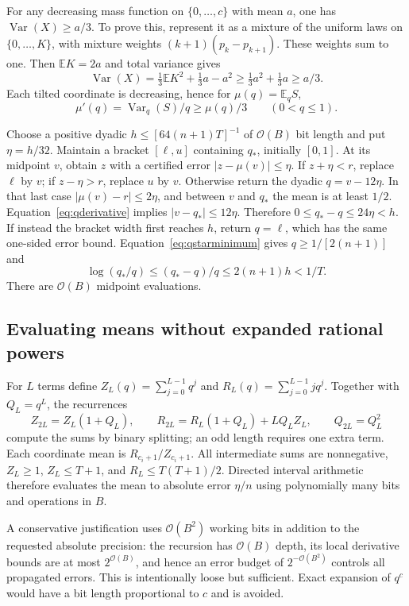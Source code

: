 \documentclass[11pt,a4paper]{article}
\theoremstyle{definition}
\newcommand{\E}{\mathbb E}
\newcommand{\Var}{\operatorname{Var}}
\newcommand{\abs}[1]{\left|#1\right|}
\newcommand{\BigO}{\mathcal O}
\begin{document}
For any decreasing mass function on $\{0,\ldots,c\}$ with mean $a$, one has $\Var(X)\ge a/3$. To prove this, represent it as a mixture of the uniform laws on $\{0,\ldots,K\}$, with mixture weights $(k+1)(p_k-p_{k+1})$. These weights sum to one. Then $\E K=2a$ and total variance gives
\[
 \Var(X)=\tfrac13\E K^2+\tfrac13a-a^2
 \ge\tfrac13a^2+\tfrac13a\ge a/3.
\]
Each tilted coordinate is decreasing, hence for $\mu(q)=\E_qS$,
\begin{equation}\label{eq:qderivative}
 \mu'(q)=\Var_q(S)/q\ge\mu(q)/3\qquad(0<q\le1).
\end{equation}

Choose a positive dyadic $h\le[64(n+1)T]^{-1}$ of $\BigO(B)$ bit length and put $\eta=h/32$. Maintain a bracket $[\ell,u]$ containing $q_*$, initially $[0,1]$. At its midpoint $v$, obtain $z$ with a certified error $\abs{z-\mu(v)}\le\eta$.
If $z+\eta<r$, replace $\ell$ by $v$; if $z-\eta>r$, replace $u$ by $v$. Otherwise return the dyadic $q=v-12\eta$. In that last case $\abs{\mu(v)-r}\le2\eta$, and between $v$ and $q_*$ the mean is at least $1/2$. Equation~\eqref{eq:qderivative} implies $\abs{v-q_*}\le12\eta$. Therefore $0\le q_*-q\le24\eta<h$. If instead the bracket width first reaches $h$, return $q=\ell$, which has the same one-sided error bound. Equation~\eqref{eq:qstarminimum} gives $q\ge1/[2(n+1)]$ and
\[
 \log(q_*/q)\le(q_*-q)/q\le2(n+1)h<1/T.
\]
There are $\BigO(B)$ midpoint evaluations.

\subsection{Evaluating means without expanded rational powers}

For $L$ terms define
$Z_L(q)=\sum_{j=0}^{L-1}q^j$ and $R_L(q)=\sum_{j=0}^{L-1}jq^j$.
Together with $Q_L=q^L$, the recurrences
\[
 Z_{2L}=Z_L(1+Q_L),\qquad
 R_{2L}=R_L(1+Q_L)+LQ_LZ_L,\qquad Q_{2L}=Q_L^2
\]
compute the sums by binary splitting; an odd length requires one extra term. Each coordinate mean is $R_{c_i+1}/Z_{c_i+1}$. All intermediate sums are nonnegative, $Z_L\ge1$, $Z_L\le T+1$, and $R_L\le T(T+1)/2$. Directed interval arithmetic therefore evaluates the mean to absolute error $\eta/n$ using polynomially many bits and operations in $B$.

A conservative justification uses $\BigO(B^2)$ working bits in addition to the requested absolute precision: the recursion has $\BigO(B)$ depth, its local derivative bounds are at most $2^{\BigO(B)}$, and hence an error budget of $2^{-\BigO(B^2)}$ controls all propagated errors. This is intentionally loose but sufficient. Exact expansion of $q^c$ would have a bit length proportional to $c$ and is avoided.
\end{document}
